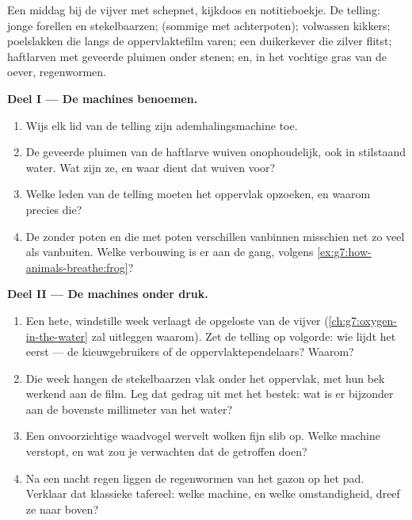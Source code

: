 \begin{problem}\label{pb:g7:how-animals-breathe:1}
Een middag bij de vijver met schepnet, kijkdoos en notitieboekje. De
telling: jonge forellen en stekelbaarzen;  (sommige met
achterpoten); volwassen kikkers; poelslakken die langs de oppervlaktefilm
varen; een duikerkever die zilver flitst; haftlarven met geveerde pluimen
onder stenen; en, in het vochtige gras van de oever, regenwormen.

\medskip\noindent\textbf{Deel I --- De machines benoemen.}
\begin{enumerate}
  \item Wijs elk lid van de telling zijn ademhalingsmachine toe.
  \item De geveerde pluimen van de haftlarve wuiven onophoudelijk, ook in
        stilstaand water. Wat zijn ze, en waar dient dat wuiven voor?
  \item Welke leden van de telling moeten het oppervlak opzoeken, en
        waarom precies die?
  \item De  zonder poten en die met poten verschillen
        vanbinnen misschien net zo veel als vanbuiten. Welke verbouwing
        is er aan de gang, volgens
        \cref{ex:g7:how-animals-breathe:frog}?
\end{enumerate}

\medskip\noindent\textbf{Deel II --- De machines onder
druk.}
\begin{enumerate}[resume]
  \item Een hete, windstille week verlaagt de opgeloste  van de
        vijver (\cref{ch:g7:oxygen-in-the-water} zal uitleggen waarom).
        Zet de telling op volgorde: wie lijdt het eerst --- de
        kieuwgebruikers of de oppervlaktependelaars? Waarom?
  \item Die week hangen de stekelbaarzen vlak onder het oppervlak, met
        hun bek werkend aan de film. Leg dat gedrag uit met het bestek:
        wat is er bijzonder aan de bovenste millimeter van het water?
  \item Een onvoorzichtige waadvogel wervelt wolken fijn slib op. Welke
        machine verstopt, en wat zou je verwachten dat de getroffen
         doen?
  \item Na een nacht regen liggen de regenwormen van het gazon op het pad.
        Verklaar dat klassieke tafereel: welke machine, en welke
        omstandigheid, dreef ze naar boven?
\end{enumerate}


\end{problem}

